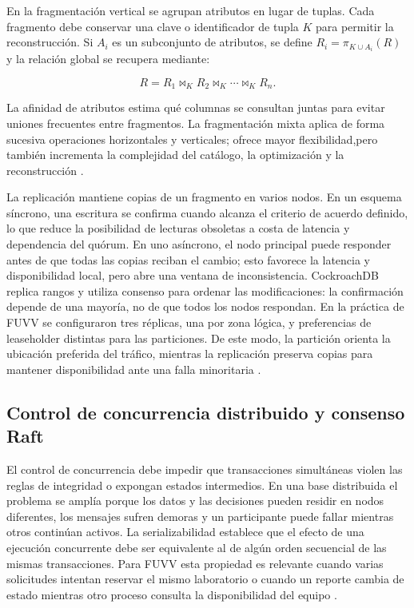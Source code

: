 \documentclass[12pt,a4paper]{article}
\begin{document}
En la fragmentación vertical se agrupan atributos en lugar de tuplas. Cada fragmento debe conservar una clave o identificador de tupla $K$ para permitir la reconstrucción. Si $A_i$ es un subconjunto de atributos, se define $R_i=\pi_{K\cup A_i}(R)$ y la relación global se recupera mediante:

\begin{equation}
  R = R_1 \bowtie_K R_2 \bowtie_K \cdots \bowtie_K R_n.
  \label{eq:reconstruccion-vertical}
\end{equation}

La afinidad de atributos estima qué columnas se consultan juntas para evitar uniones frecuentes entre fragmentos. La fragmentación mixta aplica de forma sucesiva operaciones horizontales y verticales; ofrece mayor flexibilidad,pero también incrementa la complejidad del catálogo, la optimización y la reconstrucción \cite{ozsu2020distributed,abdalla2023rddbs}.

La replicación mantiene copias de un fragmento en varios nodos. En un esquema síncrono, una escritura se confirma cuando alcanza el criterio de acuerdo definido, lo que reduce la posibilidad de lecturas obsoletas a costa de latencia y dependencia del quórum. En uno asíncrono, el nodo principal puede responder antes de que todas las copias reciban el cambio; esto favorece la latencia y disponibilidad local, pero abre una ventana de inconsistencia. CockroachDB replica rangos y utiliza consenso para ordenar las modificaciones: la confirmación depende de una mayoría, no de que todos los nodos respondan. En la práctica de FUVV se configuraron tres réplicas, una por zona lógica, y preferencias de leaseholder distintas para las particiones. De este modo, la partición orienta la ubicación preferida del tráfico, mientras la replicación preserva copias para mantener disponibilidad ante una falla minoritaria \cite{taft2020cockroachdb,vanbenschoten2022multiregion}.

\subsection{Control de concurrencia distribuido y consenso Raft}
\label{subsec:concurrencia-raft}

El control de concurrencia debe impedir que transacciones simultáneas violen las reglas de integridad o expongan estados intermedios. En una base distribuida el problema se amplía porque los datos y las decisiones pueden residir en nodos diferentes, los mensajes sufren demoras y un participante puede fallar mientras otros continúan activos. La serializabilidad establece que el efecto de una ejecución concurrente debe ser equivalente al de algún orden secuencial de las mismas transacciones. Para FUVV esta propiedad es relevante cuando varias solicitudes intentan reservar el mismo laboratorio o cuando un reporte cambia de estado mientras otro proceso consulta la disponibilidad del equipo \cite{ozsu2020distributed,kleppmann2017ddia}.
\end{document}
